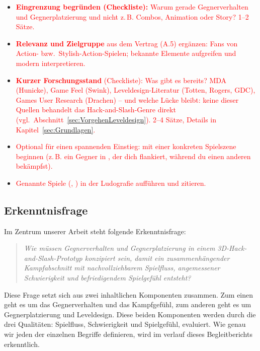 \documentclass[../Main.tex]{subfiles}
\begin{document}
\begin{itemize}[leftmargin=1.5cm]
    \item \textcolor{red}{\textbf{Eingrenzung begründen (Checkliste):} Warum gerade Gegnerverhalten und Gegnerplatzierung und nicht z.\,B. Combos, Animation oder Story? 1--2 Sätze.}
    \item \textcolor{red}{\textbf{Relevanz und Zielgruppe} aus dem Vertrag (A.5) ergänzen: Fans von Action- bzw.\ Stylish-Action-Spielen; bekannte Elemente aufgreifen und modern interpretieren.}
    \item \textcolor{red}{\textbf{Kurzer Forschungsstand} (Checkliste): Was gibt es bereits? MDA (Hunicke), Game Feel (Swink), Leveldesign-Literatur (Totten, Rogers, GDC), Games User Research (Drachen) -- und welche Lücke bleibt: keine dieser Quellen behandelt das Hack-and-Slash-Genre direkt (vgl.\ Abschnitt~\ref{sec:VorgehenLeveldesign}). 2--4 Sätze, Details in Kapitel~\ref{sec:Grundlagen}.}
    \item \textcolor{red}{Optional für einen spannenden Einstieg: mit einer konkreten Spielszene beginnen (z.\,B. ein Gegner in , der dich flankiert, während du einen anderen bekämpfst).}
    \item \textcolor{red}{Genannte Spiele (, ) in der Ludografie aufführen und zitieren.}
\end{itemize}

\subsection{Erkenntnisfrage} \label{sec:Erkenntnisfrage}

Im Zentrum unserer Arbeit steht folgende Erkenntnisfrage:

\vspace{\baselineskip}

\begin{quote}
    \textit{Wie müssen Gegnerverhalten und Gegnerplatzierung in einem 3D-Hack-and-Slash-Prototyp konzipiert sein, damit ein zusammenhängender Kampfabschnitt mit nachvollziehbarem Spielfluss, angemessener Schwierigkeit und befriedigendem Spielgefühl entsteht?}
\end{quote}

\vspace{\baselineskip}

Diese Frage setzt sich aus zwei inhaltlichen Komponenten zusammen. Zum einen geht es um das Gegnerverhalten und das Kampfgefühl, zum anderen geht es um Gegnerplatzierung und Leveldesign. Diese beiden Komponenten werden durch die drei Qualitäten: Spielfluss, Schwierigkeit und Spielgefühl, evaluiert. Wie genau wir jeden der einzelnen Begriffe definieren, wird im verlauf dieses Begleitberichts erkenntlich.
\end{document}
